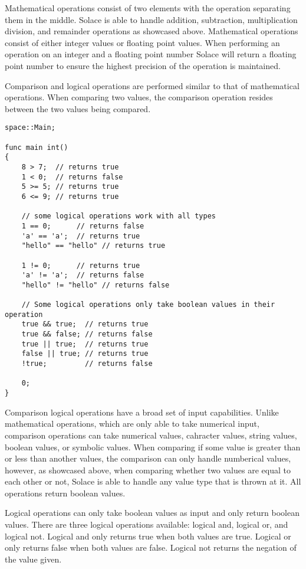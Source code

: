 \documentclass{article}
\begin{document}
Mathematical operations consist of two elements with the operation separating them in the middle. Solace is able to handle addition, subtraction, multiplication
division, and remainder operations as showcased above. Mathematical operations consist of either integer values or floating point values. When performing an
operation on an integer and a floating point number Solace will return a floating point number to ensure the highest precision of the operation is maintained.

Comparison and logical operations are performed similar to that of mathematical operations. When comparing two values, the comparison operation resides between the two
values being compared.

\begin{lstlisting}
space::Main;

func main int()
{
	8 > 7;  // returns true
	1 < 0;  // returns false
	5 >= 5; // returns true
	6 <= 9; // returns true

	// some logical operations work with all types
	1 == 0;      // returns false
	'a' == 'a';  // returns true
	"hello" == "hello" // returns true

	1 != 0;      // returns true
	'a' != 'a';  // returns false
	"hello" != "hello" // returns false

	// Some logical operations only take boolean values in their operation
	true && true;  // returns true
	true && false; // returns false
	true || true;  // returns true
	false || true; // returns true
	!true;		   // returns false

	0;
}
\end{lstlisting}

Comparison logical operations have a broad set of input capabilities. Unlike mathematical operations, which are only able to take numerical input,
comparison operations can take numerical values, cahracter values, string values, boolean values, or symbolic values. When comparing if some value is
greater than or less than another values, the comparison can only handle numberical values, however, as showcased above, when comparing whether two
values are equal to each other or not, Solace is able to handle any value type that is thrown at it. All operations return boolean values.

Logical operations can only take boolean values as input and only return boolean values. There are three logical operations available: logical and,
logical or, and logical not. Logical and only returns true when both values are true. Logical or only returns false when both values are false.
Logical not returns the negation of the value given.
\end{document}
